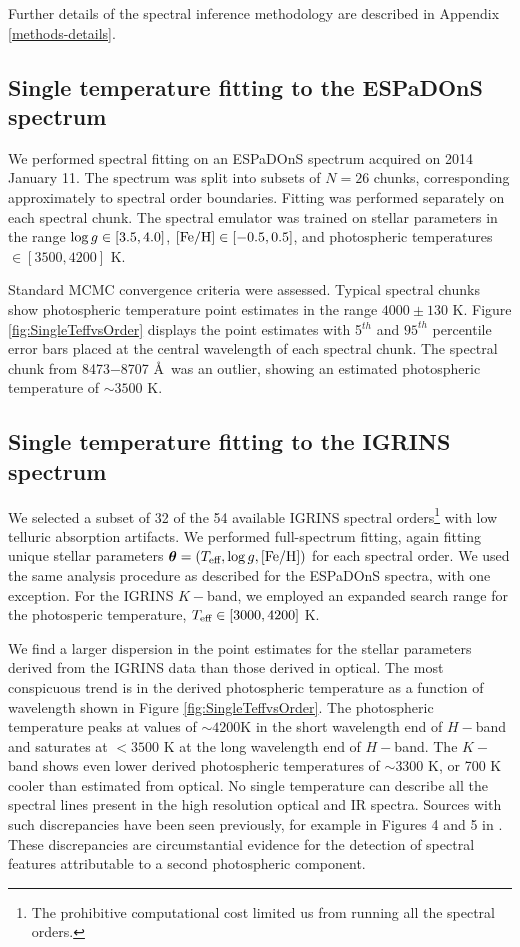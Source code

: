 \documentclass[twocolumn]{emulateapj}%
\begin{document}
Further details of the spectral inference methodology are described in Appendix \ref{methods-details}.


\subsection{Single temperature fitting to the ESPaDOnS spectrum}\label{sec:ESP_starfish}

We performed spectral fitting on an ESPaDOnS spectrum acquired on 2014 January 11.  The spectrum was split into subsets of $N=26$ chunks, corresponding approximately to spectral order boundaries.  Fitting was performed separately on each spectral chunk.  The spectral emulator was trained on stellar parameters in the range $\log g \in [3.5, 4.0]$, $[{\rm Fe}/{\rm H}] \in [-0.5, 0.5]$, and photospheric temperatures $\in [3500, 4200]$ K.

Standard MCMC convergence criteria were assessed.  Typical spectral chunks show photospheric temperature point estimates in the range $4000\pm130$ K.  Figure \ref{fig:SingleTeffvsOrder} displays the point estimates with 5$^{th}$ and $95^{th}$ percentile error bars placed at the central wavelength of each spectral chunk.  The spectral chunk from 8473$-$8707 \AA\ was an outlier, showing an estimated photospheric temperature of $\sim3500$ K.

\subsection{Single temperature fitting to the IGRINS spectrum}\label{sec:IGR_starfish}

We selected a subset of 32 of the 54 available IGRINS spectral orders\footnote{The prohibitive computational cost limited us from running all the spectral orders.} with low telluric absorption artifacts.  We performed full-spectrum fitting, again fitting unique stellar parameters ${\bm \theta} = (T_\textrm{eff}, \log g, [{\rm Fe}/{\rm H}])$ for each spectral order.  We used the same analysis procedure as described for the ESPaDOnS spectra, with one exception.  For the IGRINS $K-$band, we employed an expanded search range for the photosperic temperature, $T_\textrm{eff} \in [3000, 4200]$ K.

We find a larger dispersion in the point estimates for the stellar parameters derived from the IGRINS data than those derived in optical.  The most conspicuous trend is in the derived photospheric temperature as a function of wavelength shown in Figure \ref{fig:SingleTeffvsOrder}.  The photospheric temperature peaks at values of $\sim4200$K in the short wavelength end of $H-$band and saturates at $<3500$ K at the long wavelength end of $H-$band.  The $K-$band shows even lower derived photospheric temperatures of $\sim3300$ K, or 700 K cooler than estimated from optical.  No single temperature can describe all the spectral lines present in the high resolution optical and IR spectra.  
Sources with such discrepancies have been seen previously, for example in Figures 4 and 5 in \citet{bouvier92}.  These discrepancies are circumstantial evidence for the detection of spectral features attributable to a second photospheric component.
\end{document}
